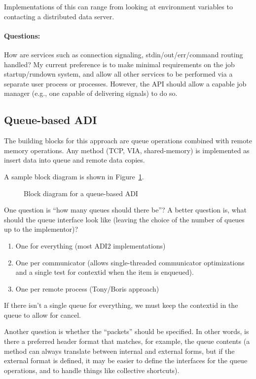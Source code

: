 \documentclass{article}
\def\questions{\ifvmode\else\par\fi\paragraph*{Questions:}}
\begin{document}
Implementations of this can range from looking at environment variables to
contacting a distributed data server.

\questions
How are services such as connection signaling, stdin/out/err/command routing
handled?   My current preference is to make minimal requirements on the job
startup/rundown system, and allow all other services to be performed via a
separate user process or processes.  However, the API should allow a capable
job manager (e.g., one capable of delivering signals) to do so.

\subsection{Queue-based ADI}
The building blocks for this approach are queue operations combined with
remote memory operations.  Any method (TCP, VIA, shared-memory) is implemented
as insert data into queue and remote data copies.

A sample block diagram is shown in Figure~\ref{fig:block-diag}.

\begin{figure}
\centerline{}
\caption{Block diagram for a queue-based ADI}\label{fig:block-diag}
\end{figure}

One question is ``how many queues should there be''?  A better question is,
what should the queue interface look like (leaving the choice of the number of
queues up to the implementor)?

\begin{enumerate}
\item One for everything (most ADI2 implementations)
\item One per communicator (allows single-threaded communicator optimizations
  and a single test for contextid when the item is enqueued).
\item One per remote process (Tony/Boris approach)
\end{enumerate}

If there isn't a single queue for everything, we must keep the contextid in
the queue to allow for cancel.

Another question is whether the ``packets'' should be specified.  In other
words, is there a preferred header format that matches, for example, the queue
contents (a method can always translate between internal and external forms,
but if the external format is defined, it may be easier to define the
interfaces for the queue operations, and to handle things like collective
shortcuts).
\end{document}
